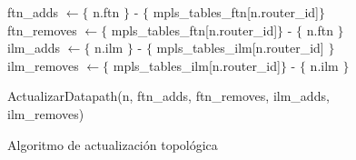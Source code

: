 \begin{figure}[ht!]
\begin{algorithm}[H]
{{ 	ftn\_adds $\gets \lbrace$ n.ftn $\rbrace$ - $\lbrace$ mpls\_tables\_ftn[n.router\_id]$\rbrace$\\
    ftn\_removes $\gets \lbrace$ mpls\_tables\_ftn[n.router\_id]$\rbrace$ - $\lbrace$ n.ftn $\rbrace$\\
    ilm\_adds $\gets \lbrace$ n.ilm $\rbrace$ - $\lbrace$ mpls\_tables\_ilm[n.router\_id] $\rbrace$\\
	ilm\_removes $\gets \lbrace$ mpls\_tables\_ilm[n.router\_id]$\rbrace$ - $\lbrace$ n.ilm $\rbrace$\\		
	\vspace{0.2cm}
	
	ActualizarDatapath(n, ftn\_adds, ftn\_removes, ilm\_adds, ilm\_removes)\\
	
 	}  	
 }  
\end{algorithm}
\caption{Algoritmo de actualización topol\'ogica}
\label{fig:AlgoritmoDA1}
\end{figure}

